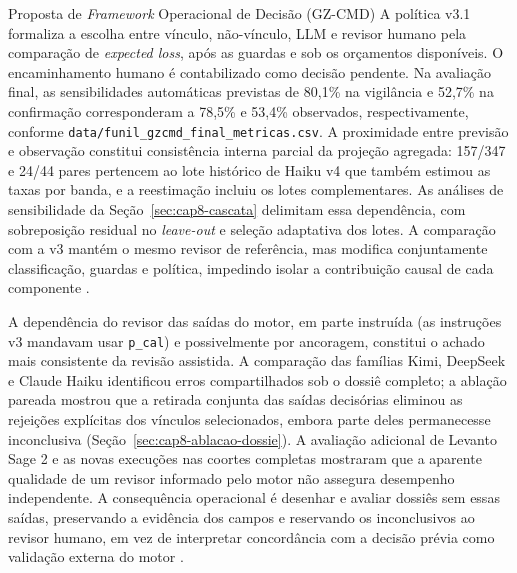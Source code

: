 \begin{chapter}{Proposta de \textit{Framework} Operacional de Decisão (GZ-CMD)}
A política v3.1 formaliza a escolha entre vínculo, não-vínculo, LLM e revisor humano pela comparação de \textit{expected loss}, após as guardas e sob os orçamentos disponíveis. O encaminhamento humano é contabilizado como decisão pendente. Na avaliação final, as sensibilidades automáticas previstas de 80,1\% na vigilância e 52,7\% na confirmação corresponderam a 78,5\% e 53,4\% observados, respectivamente, conforme \texttt{data/funil\_gzcmd\_final\_metricas.csv}. A proximidade entre previsão e observação constitui consistência interna parcial da projeção agregada: 157/347 e 24/44 pares pertencem ao lote histórico de Haiku v4 que também estimou as taxas por banda, e a reestimação incluiu os lotes complementares. As análises de sensibilidade da Seção~\ref{sec:cap8-cascata} delimitam essa dependência, com sobreposição residual no \textit{leave-out} e seleção adaptativa dos lotes. A comparação com a v3 mantém o mesmo revisor de referência, mas modifica conjuntamente classificação, guardas e política, impedindo isolar a contribuição causal de cada componente \cite{Jardim2026phdrepo}.

A dependência do revisor das saídas do motor, em parte instruída (as instruções v3 mandavam usar \texttt{p\_cal}) e possivelmente por ancoragem, constitui o achado mais consistente da revisão assistida. A comparação das famílias Kimi, DeepSeek e Claude Haiku identificou erros compartilhados sob o dossiê completo; a ablação pareada mostrou que a retirada conjunta das saídas decisórias eliminou as rejeições explícitas dos vínculos selecionados, embora parte deles permanecesse inconclusiva (Seção~\ref{sec:cap8-ablacao-dossie}). A avaliação adicional de Levanto Sage 2 e as novas execuções nas coortes completas mostraram que a aparente qualidade de um revisor informado pelo motor não assegura desempenho independente. A consequência operacional é desenhar e avaliar dossiês sem essas saídas, preservando a evidência dos campos e reservando os inconclusivos ao revisor humano, em vez de interpretar concordância com a decisão prévia como validação externa do motor \cite{Jardim2026phdrepo}.


\end{chapter}

